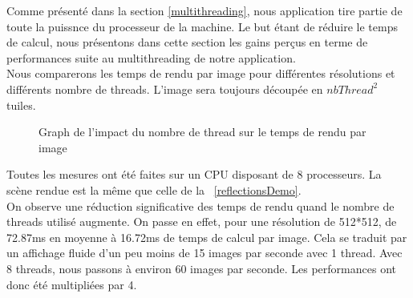\documentclass[../../Rapport RayTracer]{subfiles}
\begin{document}
Comme présenté dans la section \ref{multithreading}, nous application tire partie de toute la puissnce du processeur de la machine. Le but étant de réduire le temps de calcul, nous présentons dans cette section les gains perçus en terme de performances suite au multithreading de notre application.\\
Nous comparerons les temps de rendu par image pour différentes résolutions et différents nombre de threads. L'image sera toujours découpée en $nbThread^2$ tuiles.

\begin{figure}[h!]
	
	\caption{Graph de l'impact du nombre de thread sur le temps de rendu par image}
	\label{graphMultithreading}
\end{figure}
\FloatBarrier
Toutes les mesures ont été faites sur un CPU disposant de 8 processeurs. La scène rendue est la même que celle de la \figurename\ \ref{reflectionsDemo}.\\
On observe une réduction significative des temps de rendu quand le nombre de threads utilisé augmente. On passe en effet, pour une résolution de 512*512, de 72.87ms en moyenne à 16.72ms de temps de calcul par image. Cela se traduit par un affichage fluide d'un peu moins de 15 images par seconde avec 1 thread. Avec 8 threads, nous passons à environ 60 images par seconde. Les performances ont donc été multipliées par 4.\\
\end{document}
